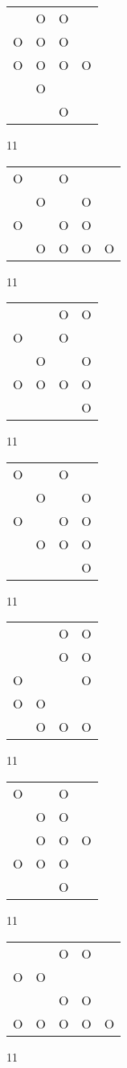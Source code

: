 \begin{tabular}{|m{0.2cm}m{0.2cm}m{0.2cm}m{0.2cm}|}\hline
 &O&O& \\
O&O&O& \\
O&O&O&O\\
 &O& & \\
 & &O& \\
\hline\end{tabular}11
\begin{tabular}{|m{0.2cm}m{0.2cm}m{0.2cm}m{0.2cm}m{0.2cm}|}\hline
O& &O& & \\
 &O& &O& \\
O& &O&O& \\
 &O&O&O&O\\
\hline\end{tabular}11
\begin{tabular}{|m{0.2cm}m{0.2cm}m{0.2cm}m{0.2cm}|}\hline
 & &O&O\\
O& &O& \\
 &O& &O\\
O&O&O&O\\
 & & &O\\
\hline\end{tabular}11
\begin{tabular}{|m{0.2cm}m{0.2cm}m{0.2cm}m{0.2cm}|}\hline
O& &O& \\
 &O& &O\\
O& &O&O\\
 &O&O&O\\
 & & &O\\
\hline\end{tabular}11
\begin{tabular}{|m{0.2cm}m{0.2cm}m{0.2cm}m{0.2cm}|}\hline
 & &O&O\\
 & &O&O\\
O& & &O\\
O&O& & \\
 &O&O&O\\
\hline\end{tabular}11
\begin{tabular}{|m{0.2cm}m{0.2cm}m{0.2cm}m{0.2cm}|}\hline
O& &O& \\
 &O&O& \\
 &O&O&O\\
O&O&O& \\
 & &O& \\
\hline\end{tabular}11
\begin{tabular}{|m{0.2cm}m{0.2cm}m{0.2cm}m{0.2cm}m{0.2cm}|}\hline
 & &O&O& \\
O&O& & & \\
 & &O&O& \\
O&O&O&O&O\\
\hline\end{tabular}11
